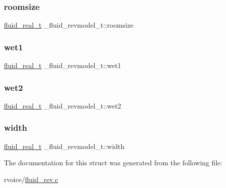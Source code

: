 \mbox{\label{struct__fluid__revmodel__t_a60639853a7c41acebcb049d2b6e633ac}} 
\subsubsection{\texorpdfstring{roomsize}{roomsize}}
{\footnotesize\ttfamily \hyperlink{fluidsynth__priv_8h_a9e96f0917747b69cabb7c671bc693dbb}{fluid\+\_\+real\+\_\+t} \+\_\+fluid\+\_\+revmodel\+\_\+t\+::roomsize}

\mbox{\label{struct__fluid__revmodel__t_a09606ab8e4edc91cf248ee7e2a1abe42}} 
\subsubsection{\texorpdfstring{wet1}{wet1}}
{\footnotesize\ttfamily \hyperlink{fluidsynth__priv_8h_a9e96f0917747b69cabb7c671bc693dbb}{fluid\+\_\+real\+\_\+t} \+\_\+fluid\+\_\+revmodel\+\_\+t\+::wet1}

\mbox{\label{struct__fluid__revmodel__t_aea3fb7ec197bef989433633c7b6a1ab7}} 
\subsubsection{\texorpdfstring{wet2}{wet2}}
{\footnotesize\ttfamily \hyperlink{fluidsynth__priv_8h_a9e96f0917747b69cabb7c671bc693dbb}{fluid\+\_\+real\+\_\+t} \+\_\+fluid\+\_\+revmodel\+\_\+t\+::wet2}

\mbox{\label{struct__fluid__revmodel__t_a3325673995255edf9836151b73a54f83}} 
\subsubsection{\texorpdfstring{width}{width}}
{\footnotesize\ttfamily \hyperlink{fluidsynth__priv_8h_a9e96f0917747b69cabb7c671bc693dbb}{fluid\+\_\+real\+\_\+t} \+\_\+fluid\+\_\+revmodel\+\_\+t\+::width}



The documentation for this struct was generated from the following file\+:\begin{DoxyCompactItemize}
\item 
rvoice/\hyperlink{fluid__rev_8c}{fluid\+\_\+rev.\+c}\end{DoxyCompactItemize}
